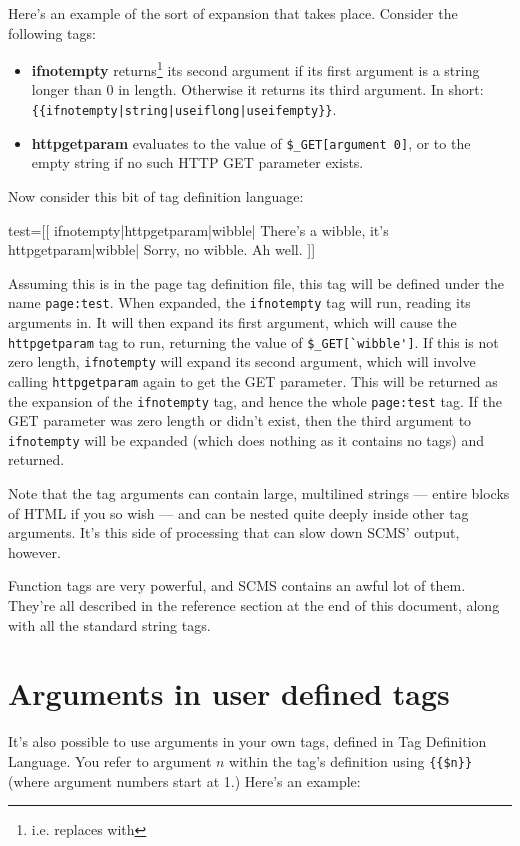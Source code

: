 Here's an example of the sort of expansion that takes place. Consider
the following tags:

\begin{itemize}
 \item \textbf{ifnotempty} returns\footnote{i.e. replaces with} its second argument if its first argument
is a string longer than 0 in length. Otherwise it returns its third argument.
In short: \verb,{{ifnotempty|string|useiflong|useifempty}},.
\item \textbf{httpgetparam} evaluates to the value of \verb,$_GET[argument 0],, or to the empty string if no such HTTP GET parameter exists.
\end{itemize}
Now consider this bit of tag definition language:
\begin{MyVerbatim}
test=[[
 {{ifnotempty|{{httpgetparam|wibble}}|
    There's a wibble, it's {{httpgetparam|wibble}}|
    Sorry, no wibble. Ah well.
}}]]
\end{MyVerbatim}
Assuming this is in the page tag definition file, this tag will be defined under the name \texttt{page:test}.
When expanded, the \texttt{ifnotempty} tag will run, reading its arguments in. It will then expand its
first argument, which will cause the \texttt{httpgetparam} tag to run, returning the value of
\verb,$_GET[`wibble'],. If this is not zero length, \texttt{ifnotempty} will expand its second argument,
which will involve calling \texttt{httpgetparam} again to get the GET parameter. This will be returned
as the expansion of the \texttt{ifnotempty} tag, and hence the whole \texttt{page:test} tag. If the
GET parameter was zero length or didn't exist, then the third argument to \texttt{ifnotempty} will
be expanded (which does nothing as it contains no tags) and returned.

Note that the tag arguments can contain large, multilined strings --- entire blocks of HTML if you so wish --- and can be nested quite deeply inside other tag arguments. It's this side of processing that can slow down SCMS' output, however.

Function tags are very powerful, and SCMS contains an awful lot of them. They're all described in the reference section at the end of this document, along with all the standard string tags.

\section{Arguments in user defined tags}
It's also possible to use arguments in your own tags, defined in Tag
Definition Language. You refer to argument $n$ within the tag's definition
using \verb,{{$n}}, (where argument numbers start at 1.) Here's an example:

